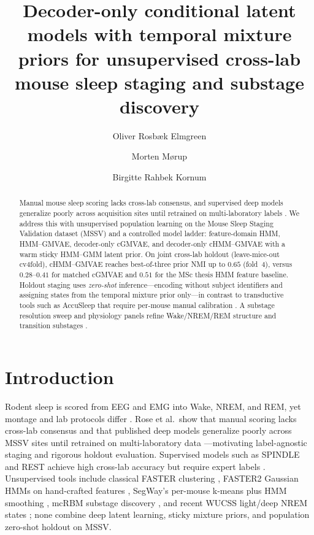 \documentclass[10pt,twocolumn]{article}
\title{Decoder-only conditional latent models with temporal mixture priors for unsupervised cross-lab mouse sleep staging and substage discovery}
\author{Oliver Rosb\ae{}k Elmgreen \and Morten M\o{}rup \and Birgitte Rahbek Kornum}
\date{}
\begin{document}
\maketitle

\begin{abstract}
Manual mouse sleep scoring lacks cross-lab consensus, and supervised deep models generalize poorly across acquisition sites until retrained on multi-laboratory labels \cite{rose2026consensus}.
We address this with unsupervised population learning on the Mouse Sleep Staging Validation dataset (MSSV) and a controlled model ladder: feature-domain HMM, HMM--GMVAE, decoder-only cGMVAE, and decoder-only cHMM--GMVAE with a warm sticky HMM--GMM latent prior.
On joint cross-lab holdout (leave-mice-out cv4fold), cHMM--GMVAE reaches best-of-three prior NMI up to $0.65$ (fold~4), versus $0.28$--$0.41$ for matched cGMVAE and $0.51$ for the MSc thesis HMM feature baseline.
Holdout staging uses \emph{zero-shot} inference---encoding without subject identifiers and assigning states from the temporal mixture prior only---in contrast to transductive tools such as AccuSleep that require per-mouse manual calibration \cite{barger2019accusleep}.
A substage resolution sweep and physiology panels refine Wake/NREM/REM structure and transition substages \cite{katsageorgiou2018mcRBM}.
\end{abstract}

\section{Introduction}
Rodent sleep is scored from EEG and EMG into Wake, NREM, and REM, yet montage and lab protocols differ \cite{rose2025mssv}.
Rose et al.\ show that manual scoring lacks cross-lab consensus and that published deep models generalize poorly across MSSV sites until retrained on multi-laboratory data \cite{rose2026consensus}---motivating label-agnostic staging and rigorous holdout evaluation.
Supervised models such as SPINDLE and REST achieve high cross-lab accuracy but require expert labels \cite{miladinovic2019spindle,wang2026rest}.
Unsupervised tools include classical FASTER clustering \cite{sunagawa2013faster}, FASTER2 Gaussian HMMs on hand-crafted features \cite{yamada2024faster2}, SegWay's per-mouse k-means plus HMM smoothing \cite{yaghouby2016segway}, mcRBM substage discovery \cite{katsageorgiou2018mcRBM}, and recent WUCSS light/deep NREM states \cite{cusinato2024wucss}; none combine deep latent learning, sticky mixture priors, and population zero-shot holdout on MSSV.
\end{document}
